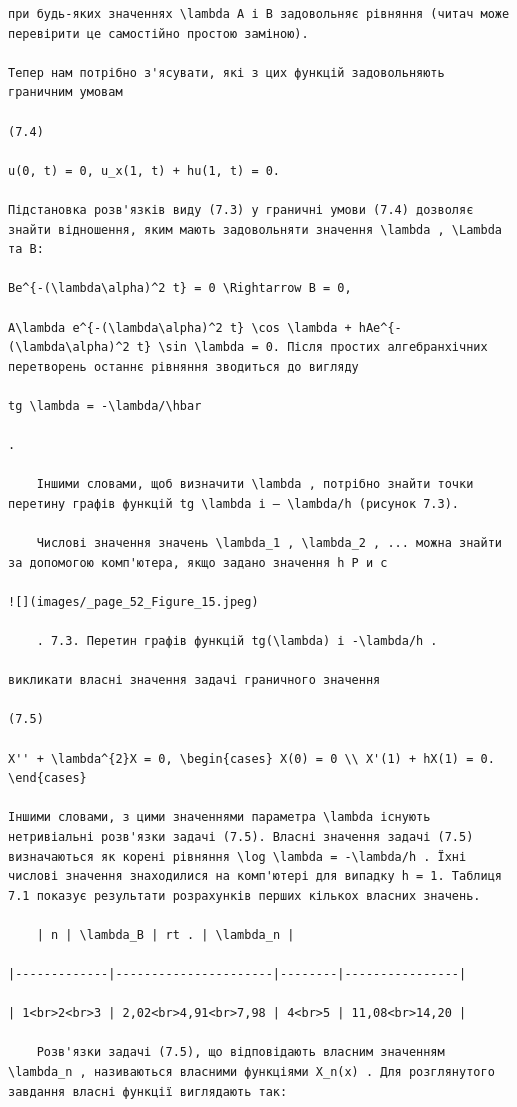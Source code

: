 \documentclass[
  ukrainian,
]{article}
\begin{document}
\begin{verbatim}
при будь-яких значеннях \lambda A і B задовольняє рівняння (читач може перевірити це самостійно простою заміною).

Тепер нам потрібно з'ясувати, які з цих функцій задовольняють граничним умовам

(7.4)

u(0, t) = 0, u_x(1, t) + hu(1, t) = 0.

Підстановка розв'язків виду (7.3) у граничні умови (7.4) дозволяє знайти відношення, яким мають задовольняти значення \lambda , \Lambda та B:

Be^{-(\lambda\alpha)^2 t} = 0 \Rightarrow B = 0,

A\lambda e^{-(\lambda\alpha)^2 t} \cos \lambda + hAe^{-(\lambda\alpha)^2 t} \sin \lambda = 0. Після простих алгебранхічних перетворень останнє рівняння зводиться до вигляду

tg \lambda = -\lambda/\hbar

.

    Іншими словами, щоб визначити \lambda , потрібно знайти точки перетину графів функцій tg \lambda і — \lambda/h (рисунок 7.3).

    Числові значення значень \lambda_1 , \lambda_2 , ... можна знайти за допомогою комп'ютера, якщо задано значення h Р и с

![](images/_page_52_Figure_15.jpeg)

    . 7.3. Перетин графів функцій tg(\lambda) і -\lambda/h .

викликати власні значення задачі граничного значення

(7.5)

X'' + \lambda^{2}X = 0, \begin{cases} X(0) = 0 \\ X'(1) + hX(1) = 0. \end{cases}

Іншими словами, з цими значеннями параметра \lambda існують нетривіальні розв'язки задачі (7.5). Власні значення задачі (7.5) визначаються як корені рівняння \log \lambda = -\lambda/h . Їхні числові значення знаходилися на комп'ютері для випадку h = 1. Таблиця 7.1 показує результати розрахунків перших кількох власних значень.

    | n | \lambda_B | rt . | \lambda_n |

|-------------|----------------------|--------|----------------|

| 1<br>2<br>3 | 2,02<br>4,91<br>7,98 | 4<br>5 | 11,08<br>14,20 |

    Розв'язки задачі (7.5), що відповідають власним значенням \lambda_n , називаються власними функціями X_n(x) . Для розглянутого завдання власні функції виглядають так:


\end{verbatim}
\end{document}
